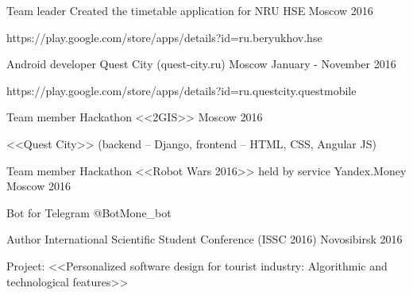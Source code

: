 \begin{cventries}

\cventry
{Team leader} %
{Created the timetable application for NRU HSE} %
{Moscow} %
{2016} %
{ %
	\begin{cvitems}
		\item {https://play.google.com/store/apps/details?id=ru.beryukhov.hse}
	\end{cvitems}
}



\cventry
{Android developer} %
{Quest City (quest-city.ru)} %
{Moscow} %
{January - November 2016} %
{ %
	\begin{cvitems}
		\item {https://play.google.com/store/apps/details?id=ru.questcity.questmobile}
	\end{cvitems}
}



\cventry
{Team member} %
{Hackathon <<2GIS>>} %
{Moscow} %
{2016} %
{ %
\begin{cvitems}
\item {<<Quest City>> (backend – Django, frontend – HTML, CSS, Angular JS)}
\end{cvitems}
}


\cventry
{Team member} %
{Hackathon <<Robot Wars 2016>> held by service Yandex.Money} %
{Moscow} %
{2016} %
{ %
\begin{cvitems}
\item {Bot for Telegram @BotMone\_bot}
\end{cvitems}
}


\cventry
{Author} %
{International Scientific Student Conference (ISSC 2016)} %
{Novosibirsk} %
{2016} %
{ %
\begin{cvitems}
\item {Project: <<Personalized software design for tourist industry: Algorithmic and technological features>>}
\end{cvitems}
}



\end{cventries}
